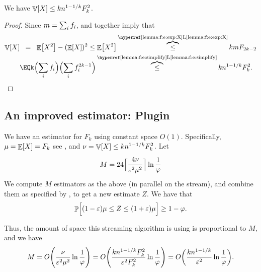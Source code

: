 
\begin{lemma}
    We have $\mathop{\mathbb{V}}\!\left[ {X} \right] \leq k n^{1-1/k} F_k^2$.
\end{lemma}
\begin{proof}
    Since $m = \sum_i f_i$,  and
     together imply that
    \begin{align*}
        \Var{X}%
        &\EQ%
        \Ex{X^2} - (\Ex{X})^2 \leq \Ex{X^2}%
        \overbrace{\leq}^{\text{\lemrefshort{f:e:exp:X}}}
        k m \Frq_{2k-2}%
        \\&
        \EQ%
        k \Bigl({\sum_i \frq_i} \Bigr) \Bigl( \sum_i \frq_i^{2k-1}
        \Bigr) %
        \overbrace{\leq}^{\text{\lemrefshort{f:e:simplify}}}
        k n^{1-1/k} \Frq_k^2.
    \end{align*}
\end{proof}



\subsection{An improved estimator: Plugin}

We have an estimator for $F_k$ using constant space
$O(1)$. Specifically, $\mu = \mathop{\mathbb{E}}\!\left[ {X} \right] = F_k$ see , and
$\nu = \mathop{\mathbb{V}}\!\left[ {X} \right] \leq k n^{1-1/k} F_k^2$. Let
\begin{equation*}
    M = 24 \Bigl\lceil{ \frac{4 \nu\bigr.}{{\varepsilon}^2\mu^2\bigr.}  }
    \Bigr\rceil \ln \frac{1}{\varphi}    
\end{equation*}
We compute $M$ estimators as the above (in parallel on the stream),
and combine them as specified by , to get a
new estimate $Z$. We have that
\begin{equation*}
    \Prob{ (1-\eps)\mu \leq Z \leq (1+\eps)\mu \Bigr.} \geq 1 -
    \BadProb.
\end{equation*}

Thus, the amount of space this streaming algorithm is using is
proportional to $M$, and we have
\begin{equation*}
    M
    =
    O\pth{\frac{ \nu\bigr.}{\eps^2\mu^2\bigr.}  
       \ln \frac{1}{\BadProb}  }    
    =%
    O\pth{\frac{ k n^{1-1/k} \Frq_k^2 }{\eps^2\Frq_k^2\bigr.}  
       \ln \frac{1}{\BadProb}  }    
    =%
    O\pth{\frac{ k n^{1-1/k} }{\eps^2}  
       \ln \frac{1}{\BadProb}  }.    
\end{equation*}

